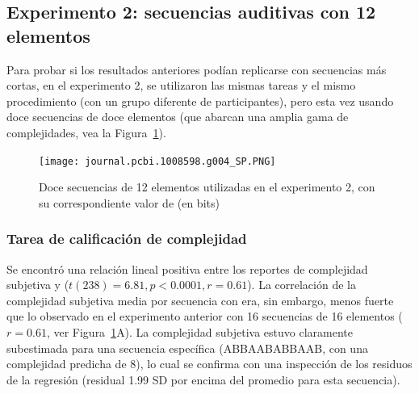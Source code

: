 \subsection{Experimento 2: secuencias auditivas con 12 elementos}
\label{BIN:EXP2:Results}


Para probar si los resultados anteriores podían replicarse con secuencias más cortas, en el experimento 2, se utilizaron las mismas tareas y el mismo procedimiento (con un grupo diferente de participantes), pero esta vez usando doce secuencias de doce elementos (que abarcan una amplia gama de complejidades, vea la Figura~\ref{PlosBIO-F4}).

\begin{figure}[t!]
   \texttt{[image: journal.pcbi.1008598.g004\_SP.PNG]}
   \centering
   \caption{Doce secuencias de 12 elementos utilizadas en el experimento 2, con su correspondiente valor de \mdlbin (en bits)}
   \label{PlosBIO-F4}
\end{figure}

\subsubsection*{Tarea de calificación de complejidad}


Se encontró una relación lineal positiva entre los reportes de complejidad subjetiva y \mdlbin ($t(238) = 6.81, p < 0.0001, r = 0.61$). La correlación de la complejidad subjetiva media por secuencia con \mdlbin era, sin embargo, menos fuerte que lo observado en el experimento anterior con 16 secuencias de 16 elementos ($r = 0.61$, ver Figura~\ref{PlosBIO-F4}A). La complejidad subjetiva estuvo claramente subestimada para una secuencia específica (ABBAABABBAAB, con una complejidad predicha de 8), lo cual se confirma con una inspección de los residuos de la regresión (residual 1.99 SD por encima del promedio para esta secuencia).

